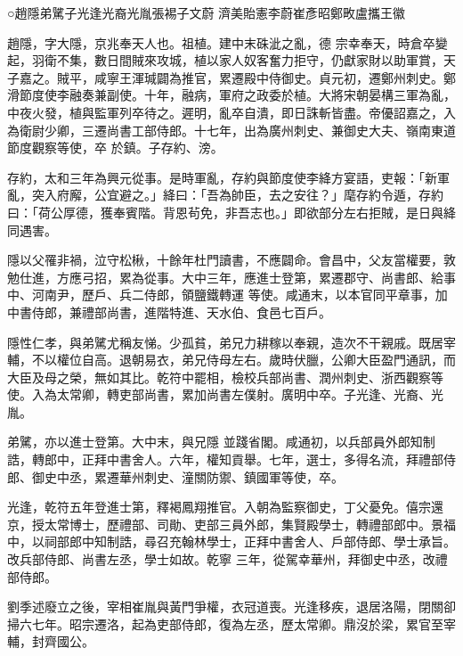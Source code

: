 
\begin{pinyinscope}

 ○趙隱弟騭子光逢光裔光胤張裼子文蔚
 濟美貽憲李蔚崔彥昭鄭畋盧攜王徽



 趙隱，字大隱，京兆奉天人也。祖植。建中末硃泚之亂，德
 宗幸奉天，時倉卒變起，羽衛不集，數日間賊來攻城，植以家人奴客奮力拒守，仍獻家財以助軍賞，天子嘉之。賊平，咸寧王渾瑊闢為推官，累遷殿中侍御史。貞元初，遷鄭州刺史。鄭滑節度使李融奏兼副使。十年，融病，軍府之政委於植。大將宋朝晏構三軍為亂，中夜火發，植與監軍列卒待之。遲明，亂卒自潰，即日誅斬皆盡。帝優詔嘉之，入為衛尉少卿，三遷尚書工部侍郎。十七年，出為廣州刺史、兼御史大夫、嶺南東道節度觀察等使，卒
 於鎮。子存約、滂。



 存約，太和三年為興元從事。是時軍亂，存約與節度使李絳方宴語，吏報：「新軍亂，突入府廨，公宜避之。」絳曰：「吾為帥臣，去之安往？」麾存約令遁，存約曰：「荷公厚德，獲奉賓階。背恩茍免，非吾志也。」即欲部分左右拒賊，是日與絳同遇害。



 隱以父罹非禍，泣守松楸，十餘年杜門讀書，不應闢命。會昌中，父友當權要，敦勉仕進，方應弓招，累為從事。大中三年，應進士登第，累遷郡守、尚書郎、給事中、河南尹，歷戶、兵二侍郎，領鹽鐵轉運
 等使。咸通末，以本官同平章事，加中書侍郎，兼禮部尚書，進階特進、天水伯、食邑七百戶。



 隱性仁孝，與弟騭尤稱友悌。少孤貧，弟兄力耕稼以奉親，造次不干親戚。既居宰輔，不以權位自高。退朝易衣，弟兄侍母左右。歲時伏臘，公卿大臣盈門通訊，而大臣及母之榮，無如其比。乾符中罷相，檢校兵部尚書、潤州刺史、浙西觀察等使。入為太常卿，轉吏部尚書，累加尚書左僕射。廣明中卒。子光逢、光裔、光胤。



 弟騭，亦以進士登第。大中末，與兄隱
 並踐省閣。咸通初，以兵部員外郎知制誥，轉郎中，正拜中書舍人。六年，權知貢舉。七年，選士，多得名流，拜禮部侍郎、御史中丞，累遷華州刺史、潼關防禦、鎮國軍等使，卒。



 光逢，乾符五年登進士第，釋褐鳳翔推官。入朝為監察御史，丁父憂免。僖宗還京，授太常博士，歷禮部、司勛、吏部三員外郎，集賢殿學士，轉禮部郎中。景福中，以祠部郎中知制誥，尋召充翰林學士，正拜中書舍人、戶部侍郎、學士承旨。改兵部侍郎、尚書左丞，學士如故。乾寧
 三年，從駕幸華州，拜御史中丞，改禮部侍郎。



 劉季述廢立之後，宰相崔胤與黃門爭權，衣冠道喪。光逢移疾，退居洛陽，閉關卻掃六七年。昭宗遷洛，起為吏部侍郎，復為左丞，歷太常卿。鼎沒於梁，累官至宰輔，封齊國公。




\end{pinyinscope}
